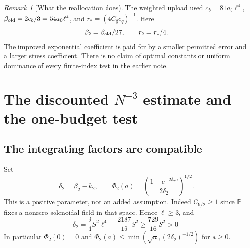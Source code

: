 \documentclass[11pt,a4paper]{article}
\theoremstyle{definition}\newtheorem{definition}[theorem]{Definition}
\theoremstyle{remark}\newtheorem{remark}[theorem]{Remark}
\newcommand{\PP}{\mathbb P}
\newcommand{\CS}{C_\sharp}
\numberwithin{equation}{section}
\begin{document}
\begin{remark}[What the reallocation does]
The weighted upload used $c_b=81a_0\ell^4$, $\beta_{\rm old}=2c_b/3=54a_0\ell^4$, and $r_*=(4\CS c_q)^{-1}$. Here
\begin{equation}\label{eq:comparisonconstants}
 \beta_2=\beta_{\rm old}/27,\qquad r_2=r_*/4.
\end{equation}
The improved exponential coefficient is paid for by a smaller permitted error and a larger stress coefficient. There is no claim of optimal constants or uniform dominance of every finite-index test in the earlier note.
\end{remark}

\section{The discounted \texorpdfstring{$N^{-3}$}{N-3} estimate and the one-budget test}
\label{sec:onebudget}
\subsection{The integrating factors are compatible}
Set
\begin{equation}\label{eq:delta2}
 \delta_2=\beta_2-k_2,\qquad
 \Phi_2(a)=\left(\frac{1-e^{-2\delta_2a}}{2\delta_2}\right)^{1/2}.
\end{equation}
This is a positive parameter, not an added assumption. Indeed $C_{9/2}\ge1$ since $\PP$ fixes a nonzero solenoidal field in that space. Hence $\ell\ge3$, and
\begin{equation}\label{eq:deltapositive}
 \delta_2=\frac94S^2\ell^4-\frac{2187}{16}S^2
 \ge\frac{729}{16}S^2>0.
\end{equation}
In particular $\Phi_2(0)=0$ and $\Phi_2(a)\le\min(\sqrt a,(2\delta_2)^{-1/2})$ for $a\ge0$.
\end{document}
